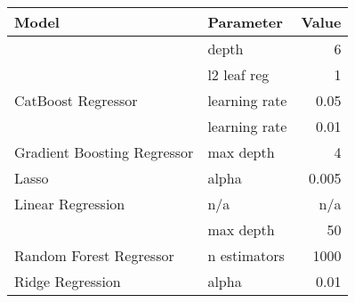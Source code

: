 
\begin{tabular}[t]{llr}
\toprule
\multicolumn{1}{l}{Model} & \multicolumn{1}{l}{Parameter} & \multicolumn{1}{l}{Value}\\
\midrule
 & depth & 6\\

 & l2 leaf reg & 1\\

\multirow[t]{-3}{*}{\raggedright\arraybackslash CatBoost Regressor} & learning rate & 0.05\\
\cmidrule(lr){1-3}

 & learning rate & 0.01\\

\multirow[t]{-2}{*}{\raggedright\arraybackslash Gradient Boosting Regressor} & max depth & 4\\
\cmidrule(lr){1-3}

Lasso & alpha & 0.005\\
\cmidrule(lr){1-3}

Linear Regression & n/a & n/a\\
\cmidrule(lr){1-3}

 & max depth & 50\\

\multirow[t]{-2}{*}{\raggedright\arraybackslash Random Forest Regressor} & n estimators & 1000\\
\cmidrule(lr){1-3}

Ridge Regression & alpha & 0.01\\
\bottomrule
\end{tabular}
